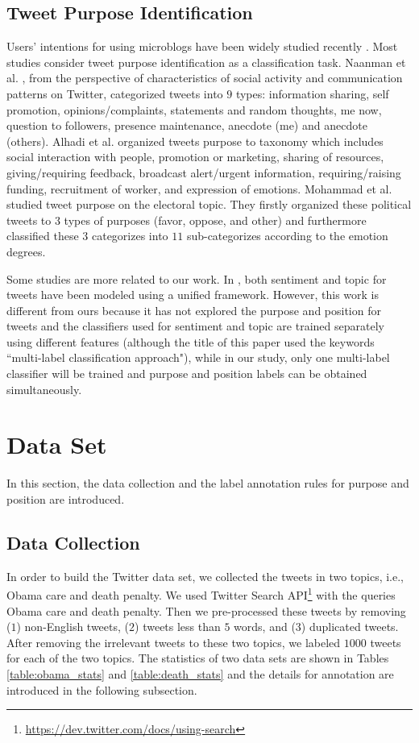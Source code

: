 \documentclass[letterpaper]{article}
\begin{document}
\subsection{Tweet Purpose Identification}
\label{subsec:tweet_purpose}
Users’ intentions for using microblogs have been widely studied recently \cite{naaman2010really,alhadi2011exploring,mohammad2013identifying}. Most studies consider tweet purpose identification as a classification task. Naanman et al. \cite{naaman2010really}, from the perspective of characteristics of social activity and communication patterns on Twitter, categorized tweets into $9$ types: information sharing, self promotion, opinions/complaints, statements and random thoughts, me now, question to followers, presence maintenance, anecdote (me) and anecdote (others). Alhadi et al. \cite{alhadi2011exploring} organized tweets purpose to taxonomy which includes social interaction with people, promotion or marketing, sharing of resources, giving/requiring feedback, broadcast alert/urgent information, requiring/raising funding, recruitment of worker, and expression of emotions. Mohammad et al. \cite{mohammad2013identifying} studied tweet purpose on the electoral topic. They firstly organized these political tweets to $3$ types of purposes (favor, oppose, and other) and furthermore classified these $3$ categorizes into $11$ sub-categorizes according to the emotion degrees.

Some studies are more related to our work. In \cite{huang2013sentiment}, both sentiment and topic for tweets have been modeled using a unified framework. However, this work is different from ours because it has not explored the purpose and position for tweets and the classifiers used for sentiment and topic are trained separately using different features (although the title of this paper used the keywords ``multi-label classification approach"), while in our study, only one multi-label classifier will be trained and purpose and position labels can be obtained simultaneously.

\section{Data Set}
\label{sec:data}
In this section, the data collection and the label annotation rules for purpose and position are introduced.

\subsection{Data Collection}
\label{subsec:collection}
In order to build the Twitter data set, we collected the tweets in two topics, i.e., Obama care and death penalty. We used Twitter Search API\footnote{\url{https://dev.twitter.com/docs/using-search}} with the queries Obama care and death penalty. Then we pre-processed these tweets by removing ($1$) non-English tweets, ($2$) tweets less than $5$ words, and ($3$) duplicated tweets. After removing the irrelevant tweets to these two topics, we labeled $1000$ tweets for each of the two topics. The statistics of two data sets are shown in Tables \ref{table:obama_stats} and \ref{table:death_stats} and the details for annotation are introduced in the following subsection.
\end{document}
